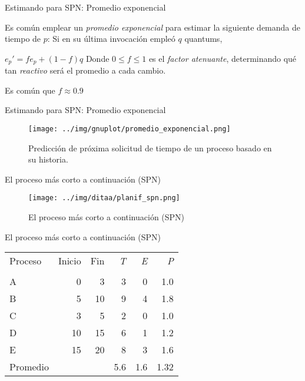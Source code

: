 \documentclass[presentation]{beamer}
\begin{document}
\begin{frame}[label={sec:org6afce52}]{Estimando para SPN: Promedio exponencial}
\begin{center}
Es común emplear un \emph{promedio exponencial} para estimar la siguiente
demanda de tiempo de \(p\): Si en su última invocación empleó \(q\)
quantums,

\(e_p' = fe_p + (1-f)q\)
\vfill
Donde \(0 \le f \le 1\) es el \emph{factor atenuante}, determinando qué tan
\emph{reactivo} será el promedio a cada cambio.

Es común que \(f \approx 0.9\)
\end{center}
\end{frame}

\begin{frame}[label={sec:orgdc30de9}]{Estimando para SPN: Promedio exponencial}
\begin{figure}[htbp]
\centering
\texttt{[image: ../img/gnuplot/promedio\_exponencial.png]}
\caption{Predicción de próxima solicitud de tiempo de un proceso basado en su historia.}
\end{figure}
\end{frame}

\begin{frame}[label={sec:org3bb8f46}]{El proceso más corto a continuación (SPN)}
\begin{figure}[htbp]
\centering
\texttt{[image: ../img/ditaa/planif\_spn.png]}
\caption{El proceso más corto a continuación (SPN)}
\end{figure}
\end{frame}

\begin{frame}[label={sec:org499eb31}]{El proceso más corto a continuación (SPN)}
\begin{center}
\begin{tabular}{lrrrrr}
Proceso & Inicio & Fin & \emph{T} & \emph{E} & \emph{P}\\
 &  &  &  &  & \\
\hline
A & 0 & 3 & 3 & 0 & 1.0\\
B & 5 & 10 & 9 & 4 & 1.8\\
C & 3 & 5 & 2 & 0 & 1.0\\
D & 10 & 15 & 6 & 1 & 1.2\\
E & 15 & 20 & 8 & 3 & 1.6\\
\hline
Promedio &  &  & 5.6 & 1.6 & 1.32\\
\end{tabular}
\end{center}
\end{frame}
\end{document}
